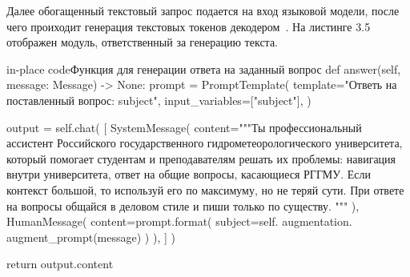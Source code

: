 Далее обогащенный текстовый запрос подается на вход языковой модели, после чего
проиходит генерация текстовых токенов декодером~\cite{a}. На листинге 3.5
отображен модуль, ответственный за генерацию текста.

\begin{codepiece}{in-place code}{Функция для генерации ответа на заданный вопрос}
        def answer(self, message: Message) -> None:
            prompt = PromptTemplate(
                template="Ответь на поставленный вопрос: {subject}",
                input_variables=["subject"],
            )
    
            output = self.chat(
                [
                    SystemMessage(
                        content="""Ты профессиональный ассистент Российского
                        государственного гидрометеорологического университета,
                        который помогает студентам и преподавателям решать их
                        проблемы: навигация внутри университета, ответ на общие
                        вопросы, касающиеся РГГМУ. Если контекст большой, то
                        используй его по максимуму, но не теряй сути.
                        При ответе на вопросы общайся в деловом стиле и пиши
                        только по существу. """
                    ),
                    HumanMessage(
                        content=prompt.format(
                            subject=self.
                            augmentation.
                            augment_prompt(message)
                        )
                    ),
                ]
            )
    
            return output.content
\end{codepiece}




\showbib




